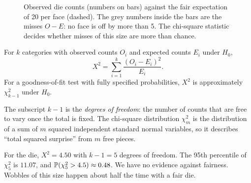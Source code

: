 \begin{figure}[H]
\centering
{}
\caption{Observed die counts (numbers on bars) against the fair expectation of
20 per face (dashed). The grey numbers inside the bars are the misses $O-E$:
no face is off by more than 5. The chi-square statistic decides whether misses
of this size are more than chance.}
\label{fig:cg-die}
\end{figure}

\begin{definition}
For $k$ categories with observed counts $O_i$ and expected counts $E_i$ under
$H_0$,
\[
  X^2 = \sum_{i=1}^{k} \frac{(O_i - E_i)^2}{E_i}.
\]
For a goodness-of-fit test with fully specified probabilities, $X^2$ is
approximately $\chi^2_{k-1}$ under $H_0$.
\end{definition}

The subscript $k-1$ is the \emph{degrees of freedom}: the number of counts
that are free to vary once the total is fixed. The chi-square distribution
$\chi^2_m$ is the distribution of a sum of $m$ squared independent standard
normal variables, so it describes ``total squared surprise'' from $m$ free
pieces.

For the die, $X^2 = 4.50$ with $k - 1 = 5$ degrees of freedom. The 95th
percentile of $\chi^2_5$ is $11.07$, and $\P(\chi^2_5 > 4.5) \approx 0.48$.
We have no evidence against fairness. Wobbles of this size happen about half
the time with a fair die.

